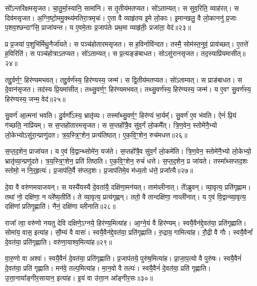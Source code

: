 सो᳚ऽन्तरि॑क्षम\-सृजत।
चा॒तु॒र्मा॒स्यानि॒ सामा॑नि।
स तृ॒तीय॑मतप्यत।
सो॑ऽताम्यत्।
स सुव॒रिति॒ व्याह॑रत्।
स दिव॑म\-सृजत।
अ॒ग्नि॒ष्टो॒ममु॒क्थ्य॑मतिरा॒त्रमृचः॑।
ए॒ता वै व्याहृ॑तय इ॒मे लो॒काः।
इ॒मान्खलु॒ वै लो॒काननु॑ प्र॒जाः प॒शव॒श्छन्दाꣳ॑सि॒ प्राजा॑यन्त।
य ए॒वमे॒ताः प्र॒जा\-प॑तेः प्रथ॒मा व्याहृ॑तीः॒ प्रजा॑ता॒ वेद॑॥२३॥

प्र प्र॒जया॑ प॒शुभि॑र्मिथु॒नैर्जा॑यते।
स पञ्च॑होतारम\-सृजत।
स ह॒विर्नावि॑न्दत।
तस्मै॒ सोम॑स्त॒नुवं॒ प्राय॑च्छत्।
ए॒तत्ते॑ ह॒विरिति॑।
स पञ्च॑होत्रा\-ऽतप्यत।
सो॑ऽताम्यत्।
स प्र॒त्यङ्ङ॑बाधत।
सोऽसु॑रान\-सृजत।
तद॒स्याप्रि॑यमासीत्॥२४॥

तद्दु॒र्वर्ण॒ꣳ॒ हिर॑ण्यमभवत्।
तद्दु॒र्वर्ण॑स्य॒ हिर॑ण्यस्य॒ जन्म॑।
स द्वि॒तीय॑मतप्यत।
सो॑ऽताम्यत्।
स प्राङ॑बाधत।
स दे॒वान॑\-सृजत।
तद॑स्य प्रि॒यमा॑सीत्।
तथ्सु॒वर्ण॒ꣳ॒ हिर॑ण्यमभवत्।
तथ्सु॒वर्ण॑स्य॒ हिर॑ण्यस्य॒ जन्म॑।
य ए॒वꣳ सु॒वर्ण॑स्य॒ हिर॑ण्यस्य॒ जन्म॒ वेद॑॥२५॥

सु॒वर्ण॑ आ॒त्मना॑ भवति।
दु॒र्वर्णो᳚\-ऽस्य॒ भ्रातृ॑व्यः।
तस्मा᳚थ्सु॒वर्ण॒ꣳ॒ हिर॑ण्यं भा॒र्यम्᳚।
सु॒वर्ण॑ ए॒व भ॑वति।
ऐनं॑ प्रि॒यं ग॑च्छति॒ नाप्रि॑यम्।
स स॒प्तहो॑तारम\-सृजत।
स स॒प्तहो᳚त्रै॒व सु॑व॒र्गं लो॒कमै᳚त्।
त्रि॒ण॒वेन॒ स्तोमे॑नै॒भ्यो लो॒केभ्यो\-ऽसु॑रा॒न्प्राणु॑दत।
त्र॒य॒स्त्रि॒ꣳ॒शेन॒ प्रत्य॑तिष्ठत्।
ए॒क॒वि॒ꣳ॒शेन॒ रुच॑मधत्त॥२६॥

स॒प्त॒द॒शेन॒ प्राजा॑यत।
य ए॒वं वि॒द्वान्थ्सोमे॑न॒ यज॑ते।
स॒प्तहो᳚त्रै॒व सु॑व॒र्गं लो॒कमे॑ति।
त्रि॒ण॒वेन॒ स्तोमे॑नै॒भ्यो लो॒केभ्यो॒ भ्रातृ॑व्या॒न्प्रणु॑दते।
त्र॒य॒स्त्रि॒ꣳ॒शेन॒ प्रति॑ तिष्ठति।
ए॒क॒वि॒ꣳ॒शेन॒ रुचं॑ धत्ते।
स॒प्त॒द॒शेन॒ प्र जा॑यते।
तस्मा᳚थ्सप्तद॒शः स्तोमो॒ न नि॒र्॒हृत्यः॑।
प्र॒जा\-प॑ति॒र्वै स॑प्तद॒शः।
प्र॒जा\-प॑तिमे॒व म॑ध्य॒तो ध॑त्ते॒ प्रजा᳚त्यै॥२७॥\anuvakamend[अ॒न॒न्द॒द्भुव॒ इति॒ व्याह॑र॒द्वेदा॑सी॒द्वेदा॑धत्त॒ प्रजा᳚त्यै]

दे॒वा वै वरु॑णमयाजयन्।
स यस्यै॑यस्यै दे॒वता॑यै॒ दक्षि॑णा॒मन॑यत्।
ताम॑व्लीनात्।
ते᳚ऽब्रुवन्।
व्या॒वृत्य॒ प्रति॑\-गृह्णाम।
तथा॑ नो॒ दक्षि॑णा॒ न व्ले᳚ष्य॒तीति॑।
ते व्या॒वृत्य॒ प्रत्य॑गृह्णन्।
ततो॒ वै तान्दक्षि॑णा॒ नाव्ली॑नात्।
य ए॒वं वि॒द्वान्व्या॒वृत्य॒ दक्षि॑णां प्रतिगृ॒ह्णाति॑।
नैनं॒ दक्षि॑णा व्लीनाति॥२८॥

राजा᳚ त्वा॒ वरु॑णो नयतु देवि दक्षिणे॒\-ऽग्नये॒ हिर॑ण्य॒मित्या॑ह।
आ॒ग्ने॒यं वै हिर॑ण्यम्।
स्वयै॒वैन॑द्दे॒वत॑या॒ प्रति॑\-गृह्णाति।
सोमा॑य॒ वास॒ इत्या॑ह।
सौ॒म्यं वै वासः॑।
स्वयै॒वैन॑द्दे॒वत॑या॒ प्रति॑\-गृह्णाति।
रु॒द्राय॒ गामित्या॑ह।
रौ॒द्री वै गौः।
स्वयै॒वैनां᳚ दे॒वत॑या॒ प्रति॑\-गृह्णाति।
वरु॑णा॒याश्व॒मित्या॑ह॥२९॥

वा॒रु॒णो वा अश्वः॑।
स्वयै॒वैनं॑ दे॒वत॑या॒ प्रति॑\-गृह्णाति।
प्र॒जा\-प॑तये॒ पुरु॑ष॒मित्या॑ह।
प्रा॒जा॒प॒त्यो वै पुरु॑षः।
स्वयै॒वैनं॑ दे॒वत॑या॒ प्रति॑ गृह्णाति।
मन॑वे॒ तल्प॒मित्या॑ह।
मा॒न॒वो वै तल्पः॑।
स्वयै॒वैनं॑ दे॒वत॑या॒ प्रति॑ गृह्णाति।
उ॒त्ता॒नाया᳚ङ्गीर॒सायान॒ इत्या॑ह।
इ॒यं वा उ॑त्ता॒न आ᳚ङ्गीर॒सः॥३०॥

